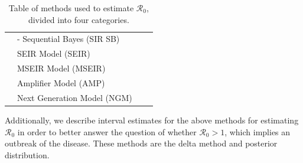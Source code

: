 \documentclass[12pt]{article}
\newcommand{\rr}{\ensuremath{\mathcal{R}_0}}
\begin{document}
\begin{table}[h]
{\begin{tabular}{@{}llll@{}}
                                  & - Sequential Bayes (SIR SB)            &                                                   &                          \\
                                  & SEIR Model (SEIR)                      &                                                   &                          \\
                                  & MSEIR Model (MSEIR)                    &                                                   &                          \\
                                  & Amplifier Model (AMP)                  &                                                   &                          \\
                                  & Next Generation Model (NGM)            &                                                   &                          \\ \bottomrule
\end{tabular}
}
\caption{Table of methods used to estimate $\rr$, divided into four categories.}
\label{tab:methods}
\end{table}

Additionally, we describe  interval estimates for the above methods for estimating $\rr$ in order to better answer the question of whether $\rr > 1$, which implies an outbreak of the disease.  These methods are the delta method and posterior distribution.
\end{document}

